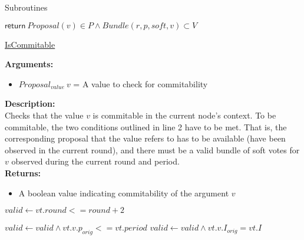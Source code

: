 \documentclass[10pt,a4paper]{article}
\begin{document}
\begin{section}{Subroutines}\label{sect:soubroutines}

\begin{algorithm}[H]
    \begin{algorithmic}[1]

    \State $\mathsf{return} \ Proposal(v) \in P \land Bundle(r,p,soft,v) \subset V$

    \EndFunction
    \end{algorithmic}
    \caption{\underline{IsCommitable}}
\end{algorithm}


\noindent \textbf{Arguments:}
\begin{itemize}
    \item $Proposal_{value} \ v$ = A value to check for commitability
  \end{itemize}

\noindent \textbf{Description:}\\
Checks that the value $v$ is commitable in the current node's context.
To be commitable, the two conditions outlined in line 2 have to be met.
That is, the corresponding proposal that the value refers to has to be
available (have been observed in the current round), and there must
be a valid bundle of soft votes for $v$ observed during the current round and
period. \\

\noindent \textbf{Returns:}
\begin{itemize}
    \item A boolean value indicating commitability of the argument $v$
  \end{itemize}


\begin{algorithm}[H]
    \begin{algorithmic}[1]
        \State $valid \gets vt.round <= round+2$
        
            \State $valid \gets valid \land vt.v.p_{orig} <= vt.period$
                \State $valid \gets valid \land vt.v.I_{orig} = vt.I$
            \EndIf
        \EndIf
        

\end{algorithmic}
\end{algorithm}
\end{section}
\end{document}
